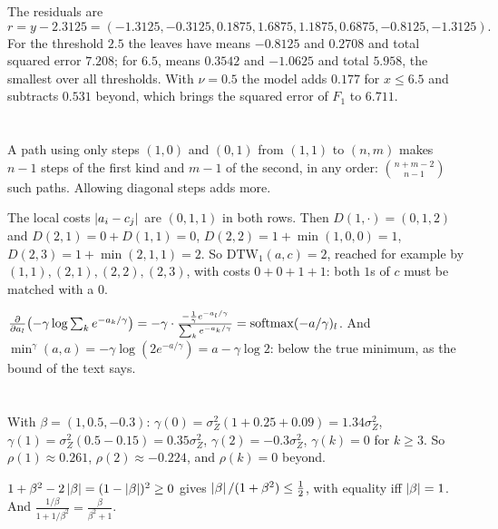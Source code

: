 The residuals are
\[
  r = y - 2.3125 = (-1.3125, -0.3125, 0.1875, 1.6875, 1.1875, 0.6875, -0.8125, -1.3125).
\]
For the
threshold $2.5$ the leaves have means $-0.8125$ and $0.2708$ and total squared error $7.208$; for $6.5$,
means $0.3542$ and $-1.0625$ and total $5.958$, the smallest over all thresholds. With $\nu = 0.5$ the
model adds $0.177$ for $x\leq6.5$ and subtracts $0.531$ beyond, which brings the squared error of
$F_1$ to $6.711$.

\section{}

A path using only steps $(1, 0)$ and $(0, 1)$ from $(1, 1)$ to $(n, m)$ makes $n - 1$ steps of the first kind and
$m - 1$ of the second, in any order: $\binom{n + m - 2}{n - 1}$ such paths. Allowing diagonal steps adds more.

The local costs $\left|a_i - c_j\right|$ are $(0, 1, 1)$ in both rows. Then $D(1, \cdot) = (0, 1, 2)$ and
$D(2, 1) = 0 + D(1, 1) = 0$, $D(2, 2) = 1 + \min(1, 0, 0) = 1$, $D(2, 3) = 1 + \min(2, 1, 1) = 2$. So $\mathrm{DTW}_1(a, c) = 2$, reached
for example by $(1, 1), (2, 1), (2, 2), (2, 3)$, with costs $0 + 0 + 1 + 1$: both $1$s of $c$ must be matched with a $0$.

$\frac\partial{\partial a_l}\bigl(-\gamma\log\sum_ke^{-a_k/\gamma}\bigr) = -\gamma\cdot\frac{-\frac1\gamma e^{-a_l/\gamma}}{\sum_ke^{-a_k/\gamma}} = \operatorname{softmax}(-a/\gamma)_l$. And
$\operatorname{min}^\gamma(a, a) = -\gamma\log(2e^{-a/\gamma}) = a - \gamma\log2$: below the true minimum, as the bound of the text
says.

\section{}

With $\beta = (1, 0.5, -0.3)$: $\gamma(0) = \sigma_Z^2(1 + 0.25 + 0.09) = 1.34\sigma_Z^2$, $\gamma(1) = \sigma_Z^2(0.5 - 0.15) = 0.35\sigma_Z^2$,
$\gamma(2) = -0.3\sigma_Z^2$, $\gamma(k) = 0$ for $k\geq3$. So $\rho(1)\approx0.261$, $\rho(2)\approx-0.224$, and $\rho(k) = 0$ beyond.

$1 + \beta^2 - 2\left|\beta\right| = (1 - \left|\beta\right|)^2\geq0$ gives $\left|\beta\right|/(1 + \beta^2)\leq\frac12$, with equality iff $\left|\beta\right| = 1$. And
$\frac{1/\beta}{1 + 1/\beta^2} = \frac\beta{\beta^2 + 1}$.

